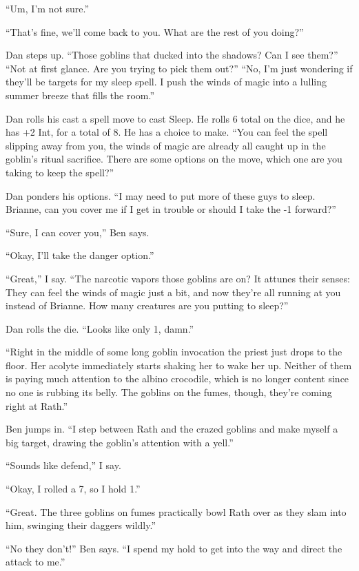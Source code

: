  ``Um, I'm not sure.''


 ``That's fine, we'll come back to you. What are the rest of you doing?''


 Dan steps up. ``Those goblins that ducked into the shadows? Can I see them?'' ``Not at first glance. Are you trying to pick them out?'' ``No, I'm just wondering if they'll be targets for my sleep spell. I push the winds of magic into a lulling summer breeze that fills the room.''


 Dan rolls his cast a spell move to cast Sleep. He rolls 6 total on the dice, and he has +2 Int, for a total of 8. He has a choice to make. ``You can feel the spell slipping away from you, the winds of magic are already all caught up in the goblin's ritual sacrifice. There are some options on the move, which one are you taking to keep the spell?''


 Dan ponders his options. ``I may need to put more of these guys to sleep. Brianne, can you cover me if I get in trouble or should I take the -1 forward?''


 ``Sure, I can cover you,'' Ben says.


 ``Okay, I'll take the danger option.''


 ``Great,'' I say. ``The narcotic vapors those goblins are on? It attunes their senses: They can feel the winds of magic just a bit, and now they're all running at you instead of Brianne. How many creatures are you putting to sleep?''


 Dan rolls the die. ``Looks like only 1, damn.''


 ``Right in the middle of some long goblin invocation the priest just drops to the floor. Her acolyte immediately starts shaking her to wake her up. Neither of them is paying much attention to the albino crocodile, which is no longer content since no one is rubbing its belly. The goblins on the fumes, though, they're coming right at Rath.''


 Ben jumps in. ``I step between Rath and the crazed goblins and make myself a big target, drawing the goblin's attention with a yell.''


 ``Sounds like defend,'' I say.


 ``Okay, I rolled a 7, so I hold 1.''


 ``Great. The three goblins on fumes practically bowl Rath over as they slam into him, swinging their daggers wildly.''


 ``No they don't!'' Ben says. ``I spend my hold to get into the way and direct the attack to me.''


